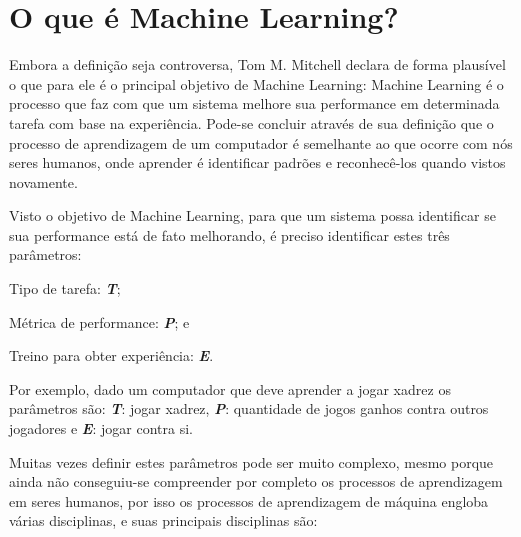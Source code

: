 \section{O que é Machine Learning?}
\label{sec:oqueemachinelearning}

Embora a definição seja controversa, Tom M. Mitchell declara de forma plausível o que para ele é o principal objetivo de Machine Learning: Machine Learning é o processo que faz com que um sistema melhore
sua performance em determinada tarefa com base na experiência\cite{Tom}. Pode-se concluir através de sua definição que o processo de aprendizagem de um 
computador é semelhante ao que ocorre com nós seres humanos, onde aprender é identificar padrões e reconhecê-los quando vistos novamente.

Visto o objetivo de Machine Learning, para que um sistema possa identificar se sua performance está de fato melhorando, é preciso identificar estes três parâmetros:
 \begin{alineascomponto}
	\item Tipo de tarefa: \textbf{\textit{T}};
	\item Métrica de performance: \textbf{\textit{P}}; e
	\item Treino para obter experiência: \textbf{\textit{E}}.			
\end{alineascomponto}
Por exemplo, dado um computador que deve aprender a jogar xadrez os parâmetros são: \textbf{\textit{T}}: jogar xadrez, \textbf{\textit{P}}: quantidade de jogos ganhos contra outros jogadores e
\textbf{\textit{E}}: jogar contra si.

Muitas vezes definir estes parâmetros pode ser muito complexo, mesmo porque ainda não conseguiu-se compreender por completo os processos
de aprendizagem em seres humanos, por isso os processos de aprendizagem de máquina engloba várias disciplinas, e suas principais disciplinas são: 
 
